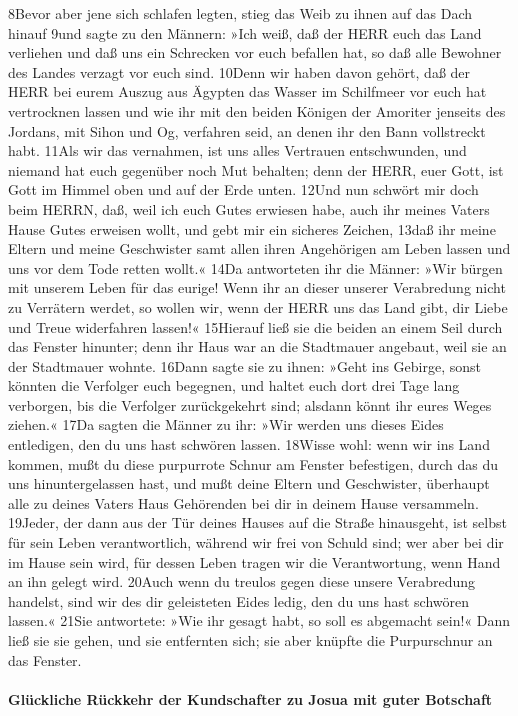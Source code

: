 8Bevor aber jene sich schlafen legten, stieg das Weib zu ihnen auf das
Dach hinauf 9und sagte zu den Männern: »Ich weiß, daß der HERR euch das
Land verliehen und daß uns ein Schrecken vor euch befallen hat, so daß
alle Bewohner des Landes verzagt vor euch sind. 10Denn wir haben davon
gehört, daß der HERR bei eurem Auszug aus Ägypten das Wasser im
Schilfmeer vor euch hat vertrocknen lassen und wie ihr mit den beiden
Königen der Amoriter jenseits des Jordans, mit Sihon und Og, verfahren
seid, an denen ihr den Bann vollstreckt habt. 11Als wir das vernahmen,
ist uns alles Vertrauen entschwunden, und niemand hat euch gegenüber
noch Mut behalten; denn der HERR, euer Gott, ist Gott im Himmel oben und
auf der Erde unten. 12Und nun schwört mir doch beim HERRN, daß, weil ich
euch Gutes erwiesen habe, auch ihr meines Vaters Hause Gutes erweisen
wollt, und gebt mir ein sicheres Zeichen, 13daß ihr meine Eltern und
meine Geschwister samt allen ihren Angehörigen am Leben lassen und uns
vor dem Tode retten wollt.« 14Da antworteten ihr die Männer: »Wir bürgen
mit unserem Leben für das eurige! Wenn ihr an dieser unserer Verabredung
nicht zu Verrätern werdet, so wollen wir, wenn der HERR uns das Land
gibt, dir Liebe und Treue widerfahren lassen!« 15Hierauf ließ sie die
beiden an einem Seil durch das Fenster hinunter; denn ihr Haus war an
die Stadtmauer angebaut, weil sie an der Stadtmauer wohnte. 16Dann sagte
sie zu ihnen: »Geht ins Gebirge, sonst könnten die Verfolger euch
begegnen, und haltet euch dort drei Tage lang verborgen, bis die
Verfolger zurückgekehrt sind; alsdann könnt ihr eures Weges ziehen.«
17Da sagten die Männer zu ihr: »Wir werden uns dieses Eides entledigen,
den du uns hast schwören lassen. 18Wisse wohl: wenn wir ins Land kommen,
mußt du diese purpurrote Schnur am Fenster befestigen, durch das du uns
hinuntergelassen hast, und mußt deine Eltern und Geschwister, überhaupt
alle zu deines Vaters Haus Gehörenden bei dir in deinem Hause
versammeln. 19Jeder, der dann aus der Tür deines Hauses auf die Straße
hinausgeht, ist selbst für sein Leben verantwortlich, während wir frei
von Schuld sind; wer aber bei dir im Hause sein wird, für dessen Leben
tragen wir die Verantwortung, wenn Hand an ihn gelegt wird. 20Auch wenn
du treulos gegen diese unsere Verabredung handelst, sind wir des dir
geleisteten Eides ledig, den du uns hast schwören lassen.« 21Sie
antwortete: »Wie ihr gesagt habt, so soll es abgemacht sein!« Dann ließ
sie sie gehen, und sie entfernten sich; sie aber knüpfte die
Purpurschnur an das Fenster.

\hypertarget{gluxfcckliche-ruxfcckkehr-der-kundschafter-zu-josua-mit-guter-botschaft}{%
\paragraph{Glückliche Rückkehr der Kundschafter zu Josua mit guter
Botschaft}\label{gluxfcckliche-ruxfcckkehr-der-kundschafter-zu-josua-mit-guter-botschaft}}

